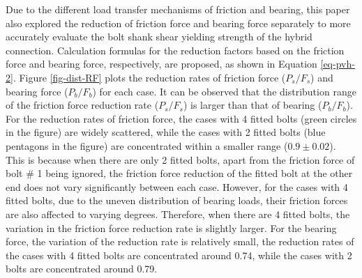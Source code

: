 Due to the different load transfer mechanisms of friction and bearing, this paper also explored the reduction of friction force and bearing force separately to more accurately evaluate the bolt shank shear yielding strength of the hybrid connection. Calculation formulas for the reduction factors based on the friction force and bearing force, respectively, are proposed, as shown in Equation \ref{eq-pvh-2}. Figure \ref{fig-dist-RF} plots the reduction rates of friction force ($P_s/F_s$) and bearing force ($P_b/F_b$) for each case. It can be observed that the distribution range of the friction force reduction rate ($P_s/F_s$) is larger than that of bearing ($P_b/F_b$). For the reduction rates of friction force, the cases with 4 fitted bolts (green circles in the figure) are widely scattered, while the cases with 2 fitted bolts (blue pentagons in the figure) are concentrated within a smaller range ($0.9 \pm 0.02$). This is because when there are only 2 fitted bolts, apart from the friction force of bolt \# 1 being ignored, the friction force reduction of the fitted bolt at the other end does not vary significantly between each case. However, for the cases with 4 fitted bolts, due to the uneven distribution of bearing loads, their friction forces are also affected to varying degrees. Therefore, when there are 4 fitted bolts, the variation in the friction force reduction rate is slightly larger. For the bearing force, the variation of the reduction rate is relatively small, the reduction rates of the cases with 4 fitted bolts are concentrated around 0.74, while the cases with 2 bolts are concentrated around 0.79.



